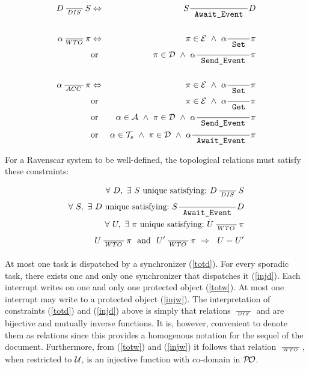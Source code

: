 \begin{eqnarray}
  D \RL{DIS} S & \Leftrightarrow & S \rgvt D \label{geinvd}\\
  \nonumber\\
  \alpha \RS{WTO} \pi & \Leftrightarrow & \pi \in {\cal E} \ \wedge \ \alpha \rset \pi\\ 
  \nonumber
  & \text{or} & \pi \in {\cal D} \ \wedge \ \alpha \rsvt \pi\\
  \nonumber \\
  \label{eq:accdef}
  \alpha \RL{ACC} \pi & \Leftrightarrow & 
  \pi \in {\cal E} \ \wedge \ \alpha \rset \pi\\
  \nonumber
  & \text{or} & \pi \in {\cal E} \ \wedge \ \alpha \rget \pi\\ 
  \nonumber 
  & \text{or} & \alpha \in {\cal A} \ \wedge \ \pi \in {\cal D} \ \wedge \ \alpha \rsvt \pi\\
  \nonumber 
  & \text{or} & \alpha \in {\cal T}_s \  \wedge \ \pi
  \in {\cal D} \ \wedge \ \alpha \rgvt \pi
\end{eqnarray}
 
For a Ravenscar system to be well-defined, the topological relations
must satisfy these constraints:

\begin{eqnarray}
\label{totd} \forall \ D, \ \exists  \ S \  \text{unique satisfying:} \ D \,\frac{}{\,^{{DIS}}\,}\, S  \\
\label{injd} \forall \ S, \ \exists  \ D \  \text{unique satisfying:} \ S  \frac{}{\text{\ttfamily\ Await\_Event\ }}  D \\
\label{totw}\ \forall \ U, \ \exists \ \pi \  \text{unique satisfying:} \ U \,\frac{}{\,^{{WTO}}\,}\, \pi \\
\label{injw} \ U \,\frac{}{\,^{{WTO}}\,}\, \pi \ \ \text{and} \  \ U' \,\frac{}{\,^{{WTO}}\,}\, \pi \ \Rightarrow \  \ U=U'
\end{eqnarray}

At most one task is dispatched by a synchronizer (\ref{totd}). For
every sporadic task, there exists one and only one synchronizer that
dispatches it (\ref{injd}). Each interrupt writes on one and
only one protected object (\ref{totw}). At most one interrupt
may write to a protected object (\ref{injw}). The
interpretation of constraints (\ref{totd}) and (\ref{injd}) above is
simply that relations $\,\frac{}{\,^{{DIS}}\,}\,$ and \rgvt are bijective and mutually
inverse functions. It is, however, convenient to denote them as
relations since this provides a homogenous notation  for the sequel of
the document. Furthermore, from (\ref{totw}) and (\ref{injw}) it
follows that relation $\,\frac{}{\,^{{WTO}}\,}\,$, when restricted to ${\cal U}$, is an
injective function with co-domain in ${\cal P\!O}$.

